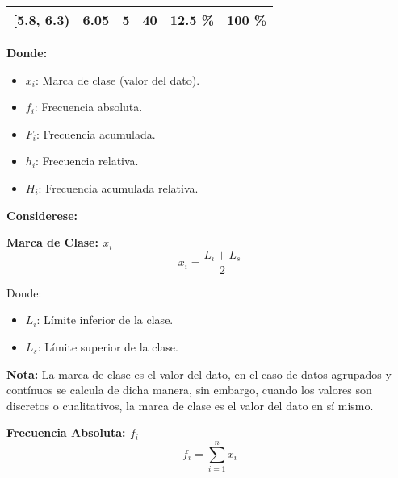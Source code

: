 \documentclass[11pt, a4paper]{article}
\newenvironment{tablaDeEjemplo}{}{}
\newenvironment{marcaDeClase}{}{}
\newenvironment{frecuenciaAbsoluta}{}{}
\begin{document}
\begin{multicols}{2}
\begin{tablaDeEjemplo}
\begin{center}
\begin{tabular}{|c|c|c|c|c|c|}
                [5.8, 6.3) & 6.05 & 5  & 40 & 12.5 \% & 100 \%  \\
                \hline
            \end{tabular}
        \end{center}
        \textbf{Donde:}
        \begin{itemize}
            \item $x_i$: Marca de clase (valor del dato).
            \item $f_i$: Frecuencia absoluta.
            \item $F_i$: Frecuencia acumulada.
            \item $h_i$: Frecuencia relativa.
            \item $H_i$: Frecuencia acumulada relativa.
        \end{itemize}        
        \textbf{Considerese:}
             
    \end{tablaDeEjemplo}
    \begin{marcaDeClase}
        \begin{center}
            \textbf{\large Marca de Clase: $x_i$}
            \hrulefill
            \begin{equation*}
                x_i = \frac{L_i + L_s}{2}
            \end{equation*}
        \end{center}
        \vspace{-1cm}
        Donde:
        \begin{itemize}
            \item $L_i$: Límite inferior de la clase.
            \item $L_s$: Límite superior de la clase.
        \end{itemize}
        \textbf{Nota:}
        La marca de clase es el valor del dato, en el caso de datos agrupados y contínuos se calcula de dicha manera, sin embargo, cuando los valores son discretos o cualitativos, la marca de clase es el valor del dato en sí mismo.
    \end{marcaDeClase}
    \begin{frecuenciaAbsoluta}
        \begin{center}
            \textbf{\large Frecuencia Absoluta: $f_i$}
            \hrulefill
            \begin{equation*}
                f_i = \sum_{i=1}^{n} x_i
            \end{equation*}
        \end{center}

\end{frecuenciaAbsoluta}
\end{multicols}
\end{document}

